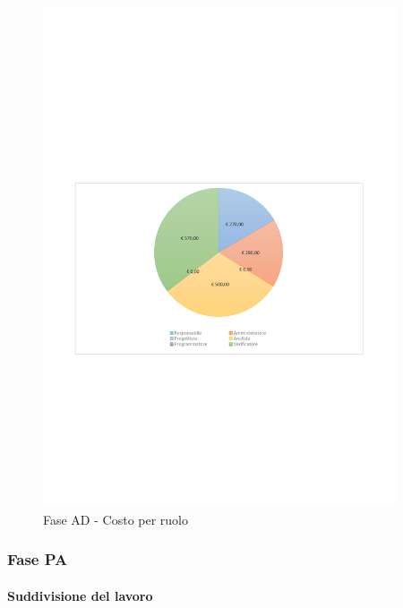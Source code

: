 \documentclass[../PianoProgetto.tex]{subfiles}
\begin{document}
	\begin{figure}[H]
		\centering
		\includegraphics[width=0.93\textwidth , trim=1.5cm 9cm 1.5cm 9cm]{grafici/AD/AD-costo}
			\caption{Fase AD - Costo per ruolo}
		\label{fig:CircleChart-faseAD_costo}
	\end{figure}
\vfill		
\newpage	
	\subsubsection{Fase PA}
				\paragraph{Suddivisione del lavoro}\
						
\end{document}
